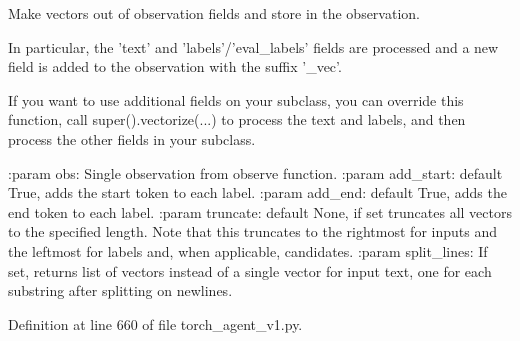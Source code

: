 \begin{DoxyVerb}Make vectors out of observation fields and store in the observation.

In particular, the 'text' and 'labels'/'eval_labels' fields are
processed and a new field is added to the observation with the suffix
'_vec'.

If you want to use additional fields on your subclass, you can override
this function, call super().vectorize(...) to process the text and
labels, and then process the other fields in your subclass.

:param obs:         Single observation from observe function.
:param add_start:   default True, adds the start token to each label.
:param add_end:     default True, adds the end token to each label.
:param truncate:    default None, if set truncates all vectors to the
            specified length. Note that this truncates to the
            rightmost for inputs and the leftmost for labels
            and, when applicable, candidates.
:param split_lines: If set, returns list of vectors instead of a single
            vector for input text, one for each substring after
            splitting on newlines.
\end{DoxyVerb}
 

Definition at line 660 of file torch\+\_\+agent\+\_\+v1.\+py.


